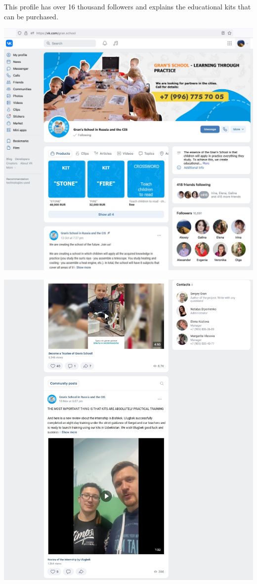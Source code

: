 
This profile has over 16 thousand followers and explains the educational kits
that can be purchased.

\begin{center}
    \includegraphics[width=\textwidth]{school-vk_eng-p1}
\end{center}
\WillContinue
\pagebreak

\Continuing
\begin{center}
    \includegraphics[width=\textwidth]{school-vk_eng-p2}
\end{center}
\WillContinue
\pagebreak


